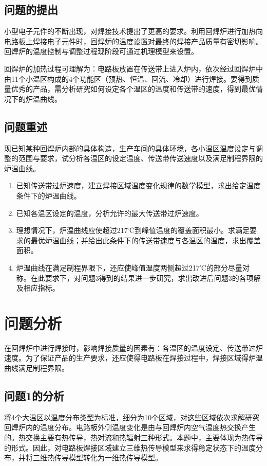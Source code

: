 \documentclass[withoutpreface,bwprint]{cumcmthesis} %
\numberwithin{equation}{subsection}
\begin{document}
\subsection{问题的提出}
小型电子元件的不断出现，对焊接技术提出了更高的要求。利用回焊炉进行加热向电路板上焊接电子元件时，回焊炉的温度设置对最终的焊接产品质量有密切影响。回焊炉的温度控制与调整过程现阶段可通过机理模型来设置。

回焊炉的加热过程可理解为：电路板放置在传送带上进入炉内，依次经过回焊炉中由11个小温区构成的4个功能区（预热、恒温、回流、冷却）进行焊接。要得到质量优秀的产品，需分析研究如何设定各个温区的温度和传送带的速度，得到最优情况下的炉温曲线。

\subsection{问题重述}
现已知某种回焊炉内部的具体构造，生产车间的具体环境，各小温区温度设定与调整的范围与要求，试分析各温区的设定温度、传送带传送速度以及满足制程界限的炉温曲线。

\begin{enumerate}[label=(\arabic*)]
\item  已知传送带过炉速度，建立焊接区域温度变化规律的数学模型，求出给定温度条件下的炉温曲线。
	
\item  已知各温区设定的温度，分析允许的最大传送带过炉速度。
	
\item  理想情况下，炉温曲线应使超过217℃到峰值温度的覆盖面积最小。求满足要求的最优炉温曲线；并给出此条件下的传送带速度与各温区的温度，求出覆盖面积。
	
\item 炉温曲线在满足制程界限下，还应使峰值温度两侧超过217℃的部分尽量对称。在此要求下，对问题3得到的结果进一步研究，求出改进后问题3的各项解及相应指标。
\end{enumerate}




\section{问题分析}
在回焊炉中进行焊接时，影响焊接质量的因素有：各温区的温度设定、传送带过炉速度。为了保证产品的生产要求，还应使得电路板在焊接过程中，焊接区域得炉温曲线满足制程界限。

\subsection{问题1的分析}
将4个大温区以温度分布类型为标准，细分为10个区域，对这些区域依次求解研究回焊炉内的温度分布。电路板外侧温度变化是由与回焊炉内空气温度热交换产生的。热交换主要有热传导，热对流和热辐射三种形式。本题中，主要体现为热传导的形式。因此，对电路板焊接区域建立三维热传导模型来求得稳定状态下的温度分布，并将三维热传导模型转化为一维热传导模型。
\end{document}
